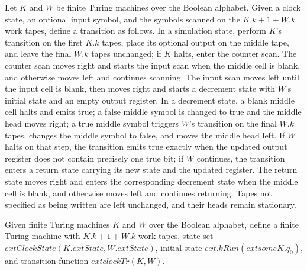 \begin{definition}
\label{Complexity.TimeHierarchy.clockTr}
\leanok
{}
Let $K$ and $W$ be finite Turing machines over the Boolean alphabet. Given a clock
state, an optional input symbol, and the symbols scanned on the $K.k+1+W.k$ work tapes,
define a transition as follows. In a simulation state, perform $K$’s transition on the
first $K.k$ tapes, place its optional output on the middle tape, and leave the final
$W.k$ tapes unchanged; if $K$ halts, enter the counter scan. The counter scan moves
right and starts the input scan when the middle cell is blank, and otherwise moves left
and continues scanning. The input scan moves left until the input cell is blank, then
moves right and starts a decrement state with $W$’s initial state and an empty output
register. In a decrement state, a blank middle cell halts and emits true; a false middle
symbol is changed to true and the middle head moves right; a true middle symbol triggers
$W$’s transition on the final $W.k$ tapes, changes the middle symbol to false, and moves
the middle head left. If $W$ halts on that step, the transition emits true exactly when
the updated output register does not contain precisely one true bit; if $W$ continues,
the transition enters a return state carrying its new state and the updated register.
The return state moves right and enters the corresponding decrement state when the
middle cell is blank, and otherwise moves left and continues returning. Tapes not
specified as being written are left unchanged, and their heads remain stationary.
\end{definition}

\begin{definition}
\label{Complexity.TimeHierarchy.clockTM}
\leanok
{}
Given finite Turing machines $K$ and $W$ over the Boolean alphabet, define a finite
Turing machine with $K.k+1+W.k$ work tapes, state set
$	ext{ClockState}(K.	ext{State},W.	ext{State})$, initial state $	ext{.kRun}(	ext{some
}K.q_0)$, and transition function $	ext{clockTr}(K,W)$.
\end{definition}

